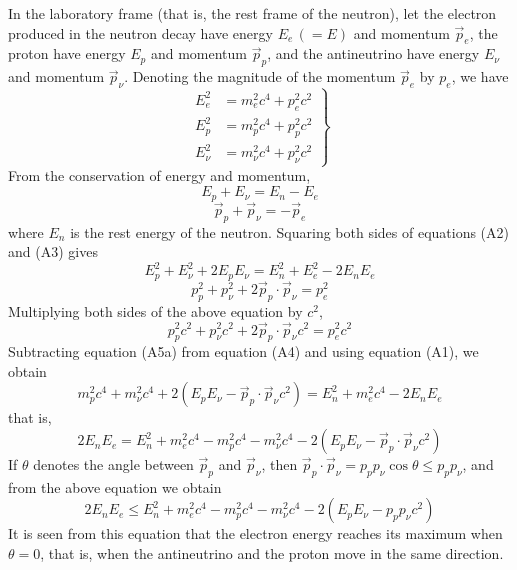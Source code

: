 In the laboratory frame (that is, the rest frame of the neutron), let the electron produced in the neutron decay have energy $E_e\,(=E)$ and momentum $\vec{p}_e$, the proton have energy $E_p$ and momentum $\vec{p}_p$, and the antineutrino have energy $E_\nu$ and momentum $\vec{p}_\nu$. Denoting the magnitude of the momentum $\vec{p}_e$ by $p_e$, we have
\begin{equation}
\left.
\begin{aligned}
E_e^2 &= m_e^2c^4+p_e^2c^2\\
E_p^2 &= m_p^2c^4+p_p^2c^2\\
E_\nu^2 &= m_\nu^2c^4+p_\nu^2c^2
\end{aligned}
\right\}\tag{A1}
\end{equation}
From the conservation of energy and momentum,
\begin{equation}
E_p+E_\nu=E_n-E_e \tag{A2}
\end{equation}
\begin{equation}
\vec{p}_p+\vec{p}_\nu=-\vec{p}_e \tag{A3}
\end{equation}
where $E_n$ is the rest energy of the neutron. Squaring both sides of equations (A2) and (A3) gives
\begin{equation}
E_p^2+E_\nu^2+2E_pE_\nu=E_n^2+E_e^2-2E_nE_e \tag{A4}
\end{equation}
\begin{equation}
p_p^2+p_\nu^2+2\vec{p}_p\cdot\vec{p}_\nu=p_e^2 \tag{A5}
\end{equation}
Multiplying both sides of the above equation by $c^2$,
\begin{equation}
p_p^2c^2+p_\nu^2c^2+2\vec{p}_p\cdot\vec{p}_\nu c^2=p_e^2c^2 \tag{A5a}
\end{equation}
Subtracting equation (A5a) from equation (A4) and using equation (A1), we obtain
\begin{equation}
m_p^2c^4+m_\nu^2c^4+2\left(E_pE_\nu-\vec{p}_p\cdot\vec{p}_\nu c^2\right)=E_n^2+m_e^2c^4-2E_nE_e \tag{A6}
\end{equation}
that is,
\begin{equation}
2E_nE_e=E_n^2+m_e^2c^4-m_p^2c^4-m_\nu^2c^4-2\left(E_pE_\nu-\vec{p}_p\cdot\vec{p}_\nu c^2\right) \tag{A7}
\end{equation}
If $\theta$ denotes the angle between $\vec{p}_p$ and $\vec{p}_\nu$, then $\vec{p}_p\cdot\vec{p}_\nu=p_pp_\nu\cos\theta\le p_pp_\nu$, and from the above equation we obtain
\begin{equation}
2E_nE_e\le E_n^2+m_e^2c^4-m_p^2c^4-m_\nu^2c^4-2\left(E_pE_\nu-p_pp_\nu c^2\right) \tag{A8}
\end{equation}
It is seen from this equation that the electron energy reaches its maximum when $\theta=0$, that is, when the antineutrino and the proton move in the same direction.

